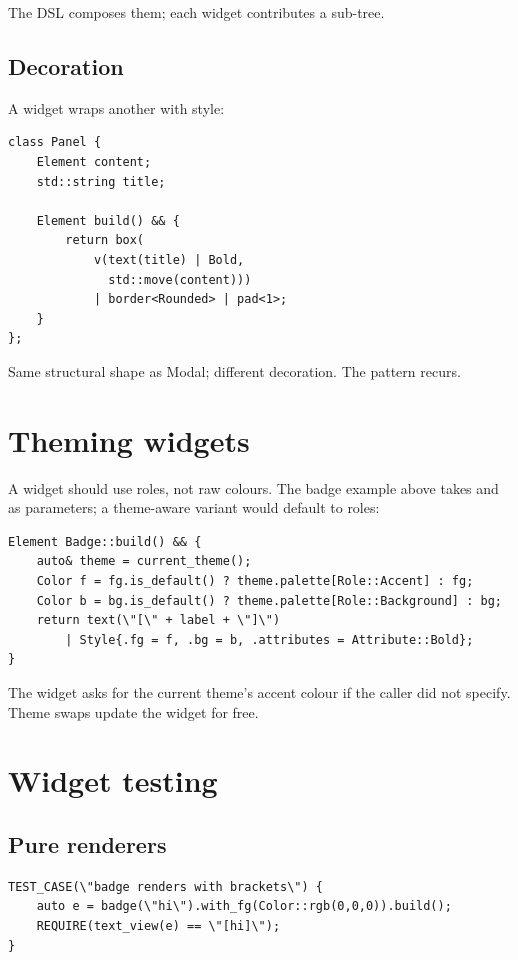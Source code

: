 The DSL composes them; each widget contributes a sub-tree.

\subsection*{Decoration}

A widget wraps another with style:

\begin{lstlisting}
class Panel {
    Element content;
    std::string title;

    Element build() && {
        return box(
            v(text(title) | Bold,
              std::move(content)))
            | border<Rounded> | pad<1>;
    }
};
\end{lstlisting}

Same structural shape as Modal; different decoration. The pattern
recurs.

\section{Theming widgets}

A widget should use roles, not raw colours. The badge example
above takes  and  as parameters; a
theme-aware variant would default to roles:

\begin{lstlisting}
Element Badge::build() && {
    auto& theme = current_theme();
    Color f = fg.is_default() ? theme.palette[Role::Accent] : fg;
    Color b = bg.is_default() ? theme.palette[Role::Background] : bg;
    return text(\"[\" + label + \"]\")
        | Style{.fg = f, .bg = b, .attributes = Attribute::Bold};
}
\end{lstlisting}

The widget asks for the current theme's accent colour if the
caller did not specify. Theme swaps update the widget for free.

\section{Widget testing}

\subsection*{Pure renderers}

\begin{lstlisting}
TEST_CASE(\"badge renders with brackets\") {
    auto e = badge(\"hi\").with_fg(Color::rgb(0,0,0)).build();
    REQUIRE(text_view(e) == \"[hi]\");
}
\end{lstlisting}


